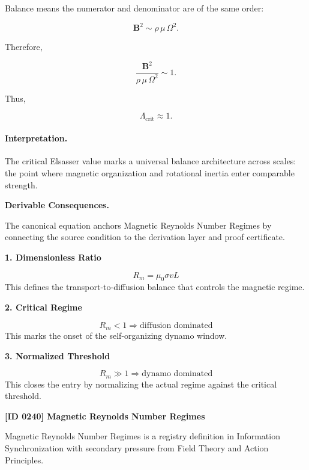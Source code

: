 Balance means the numerator and denominator are of the same order:

\begin{equation}
\mathbf{B}^2
\sim
\rho\,\mu\,\Omega^2 .
\end{equation}

Therefore,

\begin{equation}
\frac{\mathbf{B}^2}
{\rho\,\mu\,\Omega^2}
\sim
1 .
\end{equation}

Thus,

\begin{equation}
\boxed{
\Lambda_{\mathrm{crit}}\approx 1 .
}
\end{equation}

\paragraph{Interpretation.}
The critical Elsasser value marks a universal balance architecture across scales: the point where magnetic organization and rotational inertia enter comparable strength.

\par\vspace{0.35em}
\noindent\textbf{Derivable Consequences.}\quad
\begingroup
\footnotesize
\raggedright
The canonical equation anchors Magnetic Reynolds Number Regimes by connecting the source condition to the derivation layer and proof certificate.
\par\endgroup

\noindent\textbf{1. Dimensionless Ratio}\par
\[
R_m=\mu_0\sigma vL
\]
\noindent This defines the transport-to-diffusion balance that controls the magnetic regime.\par
\noindent\textbf{2. Critical Regime}\par
\[
R_m<1\Rightarrow \text{diffusion dominated}
\]
\noindent This marks the onset of the self-organizing dynamo window.\par
\noindent\textbf{3. Normalized Threshold}\par
\[
R_m\gg 1\Rightarrow \text{dynamo dominated}
\]
\noindent This closes the entry by normalizing the actual regime against the critical threshold.\par

\clearpage
\noindent\textbf{[ID 0240] Magnetic Reynolds Number Regimes}\par
\vspace{0.35em}
\begingroup\small
{}
Magnetic Reynolds Number Regimes is a registry definition in Information Synchronization with secondary pressure from Field Theory and Action Principles.

